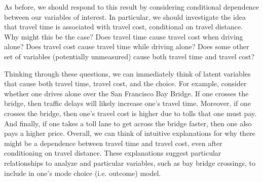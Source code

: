 As before, we should respond to this result by considering conditional dependence between our variables of interest.
In particular, we should investigate the idea that travel time is associated with travel cost, conditional on travel distance.
Why might this be the case?
Does travel time cause travel cost when driving alone?
Does travel cost cause travel time while driving alone?
Does some other set of variables (potentially unmeasured) cause both travel time and travel cost?

Thinking through these questions, we can immediately think of latent variables that cause both travel time, travel cost, and the choice.
For example, consider whether one drives alone over the San Francisco Bay Bridge.
If one crosses the bridge, then traffic delays will likely increase one's travel time.
Moreover, if one crosses the bridge, then one's travel cost is higher due to tolls that one must pay.
And finally, if one takes a toll lane to get across the bridge faster, then one also pays a higher price.
Overall, we can think of intuitive explanations for why there might be a dependence between travel time and travel cost, even after conditioning on travel distance.
These explanations suggest particular relationships to analyze and particular variables, such as bay bridge crossings, to include in one's mode choice (i.e. outcome) model.
